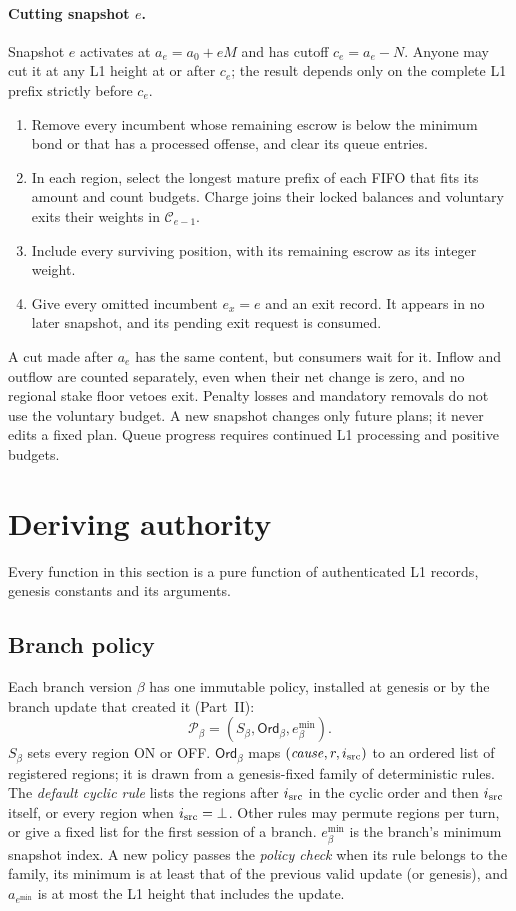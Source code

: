 \documentclass[11pt,a4paper]{article}
\newcommand{\cfg}{\mathcal C}
\newcommand{\emin}{e^{\min}}
\begin{document}
\paragraph{Cutting snapshot $e$.}
Snapshot $e$ activates at $a_e=a_0+eM$ and has cutoff $c_e=a_e-N$.
Anyone may cut it at any L1 height at or after $c_e$; the result depends
only on the complete L1 prefix strictly before $c_e$.
\begin{enumerate}[label=\textbf{\arabic*.},itemsep=2pt]
\item Remove every incumbent whose remaining escrow is below the minimum
bond or that has a processed offense, and clear its queue entries.
\item In each region, select the longest mature prefix of each FIFO that
fits its amount and count budgets. Charge joins their locked balances
and voluntary exits their weights in $\cfg_{e-1}$.
\item Include every surviving position, with its remaining escrow as its
integer weight.
\item Give every omitted incumbent $e_x=e$ and an exit record. It appears
in no later snapshot, and its pending exit request is consumed.
\end{enumerate}
A cut made after $a_e$ has the same content, but consumers wait for it.
Inflow and outflow are counted separately, even when their net change is
zero, and no regional stake floor vetoes exit. Penalty losses and
mandatory removals do not use the voluntary budget. A new snapshot
changes only future plans; it never edits a fixed plan. Queue progress
requires continued L1 processing and positive budgets.

\section{Deriving authority}
\label{sec:derive}
Every function in this section is a pure function of authenticated L1
records, genesis constants and its arguments.

\subsection{Branch policy}
\label{sec:policy}
Each branch version $\beta$ has one immutable policy, installed at
genesis or by the branch update that created it (Part~II):
\[
 \mathcal P_\beta=(S_\beta,\mathsf{Ord}_\beta,\emin_\beta).
\]
$S_\beta$ sets every region ON or OFF. $\mathsf{Ord}_\beta$ maps
$(\mathit{cause},r,i_{\rm src})$ to an ordered list of registered regions;
it is drawn from a genesis-fixed family of deterministic rules. The
\emph{default cyclic rule} lists the regions after $i_{\rm src}$ in the
cyclic order and then $i_{\rm src}$ itself, or every region when
$i_{\rm src}=\bot$. Other rules may permute regions per turn, or give a
fixed list for the first session of a branch. $\emin_\beta$ is the
branch's minimum snapshot index. A new policy passes the \emph{policy
check} when its rule belongs to the family, its minimum is at least that
of the previous valid update (or genesis), and $a_{\emin}$ is at most the
L1 height that includes the update.
\end{document}
